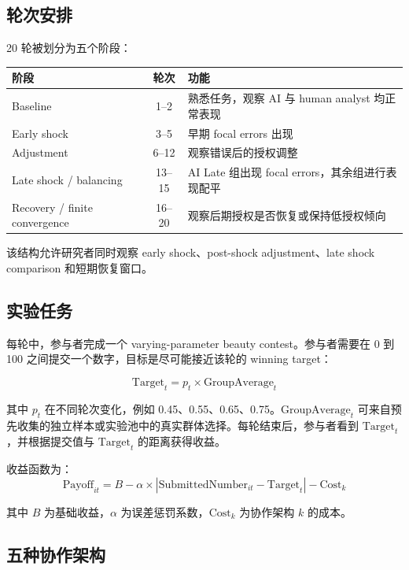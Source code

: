 \documentclass[12pt]{article}
\begin{document}
\subsection{轮次安排}

20 轮被划分为五个阶段：

\begin{center}
\begin{tabular}{lcl}
\toprule
\textbf{阶段} & \textbf{轮次} & \textbf{功能} \\
\midrule
Baseline & 1--2 & 熟悉任务，观察 AI 与 human analyst 均正常表现 \\
Early shock & 3--5 & 早期 focal errors 出现 \\
Adjustment & 6--12 & 观察错误后的授权调整 \\
Late shock / balancing & 13--15 & AI Late 组出现 focal errors，其余组进行表现配平 \\
Recovery / finite convergence & 16--20 & 观察后期授权是否恢复或保持低授权倾向 \\
\bottomrule
\end{tabular}
\end{center}

该结构允许研究者同时观察 early shock、post-shock adjustment、late shock comparison 和短期恢复窗口。

\subsection{实验任务}

每轮中，参与者完成一个 varying-parameter beauty contest。参与者需要在 0 到 100 之间提交一个数字，目标是尽可能接近该轮的 winning target：

\[
\text{Target}_t = p_t \times \text{GroupAverage}_t
\]

其中 $p_t$ 在不同轮次变化，例如 0.45、0.55、0.65、0.75。$\text{GroupAverage}_t$ 可来自预先收集的独立样本或实验池中的真实群体选择。每轮结束后，参与者看到 $\text{Target}_t$，并根据提交值与 $\text{Target}_t$ 的距离获得收益。

收益函数为：
\[
\text{Payoff}_{it} = B - \alpha \times |\text{SubmittedNumber}_{it} - \text{Target}_t| - \text{Cost}_k
\]

其中 $B$ 为基础收益，$\alpha$ 为误差惩罚系数，$\text{Cost}_k$ 为协作架构 $k$ 的成本。

\subsection{五种协作架构}
\end{document}
